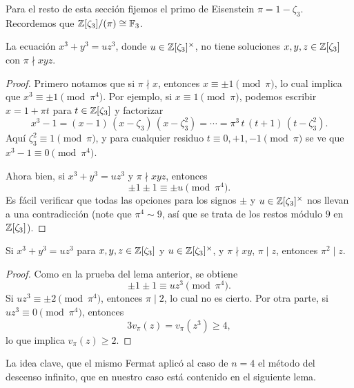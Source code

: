 
Para el resto de esta sección fijemos el primo de Eisenstein
$\pi = 1 - \zeta_3$. Recordemos que $\mathbb{Z} [\zeta_3]/(\pi) \cong \mathbb{F}_3$.

\begin{lema}
  \label{lema:FLT-3-1}
  La ecuación $x^3 + y^3 = uz^3$, donde $u \in \mathbb{Z} [\zeta_3]^\times$, no tiene
  soluciones $x,y,z \in \mathbb{Z} [\zeta_3]$ con $\pi \nmid xyz$.

  \begin{proof}
    Primero notamos que si $\pi \nmid x$, entonces $x \equiv \pm 1 \pmod{\pi}$,
    lo cual implica que $x^3 \equiv \pm 1 \pmod{\pi^4}$. Por ejemplo,
    si $x \equiv 1 \pmod{\pi}$, podemos escribir $x = 1 + \pi t$ para
    $t \in \mathbb{Z} [\zeta_3]$ y factorizar
    \[ x^3 - 1 = (x - 1)\,(x - \zeta_3)\,(x - \zeta_3^2)
           = \cdots = \pi^3 \, t \, (t + 1) \, (t - \zeta_3^2). \]
    Aquí $\zeta_3^2 \equiv 1 \pmod{\pi}$, y para cualquier residuo
    $t \equiv 0, +1, -1 \pmod{\pi}$ se ve que $x^3 - 1 \equiv 0 \pmod{\pi^4}$.

    Ahora bien, si $x^3 + y^3 = uz^3$ y $\pi \nmid xyz$, entonces
    $$\pm 1 \pm 1 \equiv \pm u \pmod{\pi^4}.$$
    Es fácil verificar que todas las opciones para los signos $\pm$ y
    $u \in \mathbb{Z} [\zeta_3]^\times$ nos llevan a una contradicción (note que
    $\pi^4 \sim 9$, así que se trata de los restos módulo $9$ en $\mathbb{Z}
    [\zeta_3]$).
  \end{proof}
\end{lema}

\begin{lema}
  \label{lema:FLT-3-2}
  Si $x^3 + y^3 = uz^3$ para $x,y,z \in \mathbb{Z} [\zeta_3]$ y
  $u \in \mathbb{Z} [\zeta_3]^\times$, y $\pi \nmid xy$, $\pi \mid z$, entonces
  $\pi^2 \mid z$.

  \begin{proof}
    Como en la prueba del lema anterior, se obtiene
    $$\pm 1 \pm 1 \equiv uz^3 \pmod{\pi^4}.$$
    Si $uz^3 \equiv \pm 2 \pmod{\pi^4}$, entonces $\pi \mid 2$, lo cual no es
    cierto. Por otra parte, si $uz^3 \equiv 0 \pmod{\pi^4}$, entonces
    $$3 v_\pi (z) = v_\pi (z^3) \ge 4,$$
    lo que implica $v_\pi (z) \ge 2$.
  \end{proof}
\end{lema}

La idea clave, que el mismo Fermat aplicó al caso de $n = 4$ el método del
descenso infinito, que en nuestro caso está contenido en el siguiente lema.

